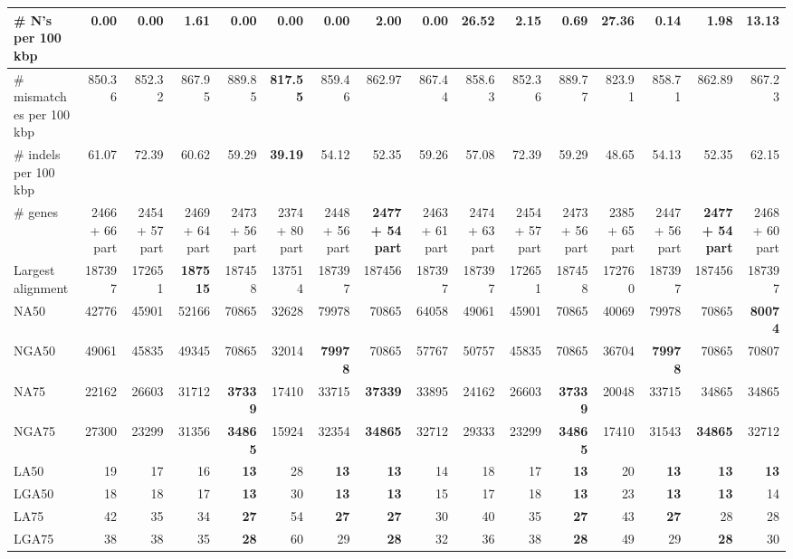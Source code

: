 \documentclass[12pt,a4paper]{article}
\begin{document}
\begin{table}[ht]
\begin{center}
\begin{tabular}{|l*{15}{|r}|}
\# N's per 100 kbp & {\bf 0.00} & {\bf 0.00} & 1.61 & {\bf 0.00} & {\bf 0.00} & {\bf 0.00} & 2.00 & {\bf 0.00} & 26.52 & 2.15 & 0.69 & 27.36 & 0.14 & 1.98 & 13.13 \\ \hline
\# mismatches per 100 kbp & 850.36 & 852.32 & 867.95 & 889.85 & {\bf 817.55} & 859.46 & 862.97 & 867.44 & 858.63 & 852.36 & 889.77 & 823.91 & 858.71 & 862.89 & 867.23 \\ \hline
\# indels per 100 kbp & 61.07 & 72.39 & 60.62 & 59.29 & {\bf 39.19} & 54.12 & 52.35 & 59.26 & 57.08 & 72.39 & 59.29 & 48.65 & 54.13 & 52.35 & 62.15 \\ \hline
\# genes & 2466 + 66 part & 2454 + 57 part & 2469 + 64 part & 2473 + 56 part & 2374 + 80 part & 2448 + 56 part & {\bf 2477 + 54 part} & 2463 + 61 part & 2474 + 63 part & 2454 + 57 part & 2473 + 56 part & 2385 + 65 part & 2447 + 56 part & {\bf 2477 + 54 part} & 2468 + 60 part \\ \hline
Largest alignment & 187397 & 172651 & {\bf 187515} & 187458 & 137514 & 187397 & 187456 & 187397 & 187397 & 172651 & 187458 & 172760 & 187397 & 187456 & 187397 \\ \hline
NA50 & 42776 & 45901 & 52166 & 70865 & 32628 & 79978 & 70865 & 64058 & 49061 & 45901 & 70865 & 40069 & 79978 & 70865 & {\bf 80074} \\ \hline
NGA50 & 49061 & 45835 & 49345 & 70865 & 32014 & {\bf 79978} & 70865 & 57767 & 50757 & 45835 & 70865 & 36704 & {\bf 79978} & 70865 & 70807 \\ \hline
NA75 & 22162 & 26603 & 31712 & {\bf 37339} & 17410 & 33715 & {\bf 37339} & 33895 & 24162 & 26603 & {\bf 37339} & 20048 & 33715 & 34865 & 34865 \\ \hline
NGA75 & 27300 & 23299 & 31356 & {\bf 34865} & 15924 & 32354 & {\bf 34865} & 32712 & 29333 & 23299 & {\bf 34865} & 17410 & 31543 & {\bf 34865} & 32712 \\ \hline
LA50 & 19 & 17 & 16 & {\bf 13} & 28 & {\bf 13} & {\bf 13} & 14 & 18 & 17 & {\bf 13} & 20 & {\bf 13} & {\bf 13} & {\bf 13} \\ \hline
LGA50 & 18 & 18 & 17 & {\bf 13} & 30 & {\bf 13} & {\bf 13} & 15 & 17 & 18 & {\bf 13} & 23 & {\bf 13} & {\bf 13} & 14 \\ \hline
LA75 & 42 & 35 & 34 & {\bf 27} & 54 & {\bf 27} & {\bf 27} & 30 & 40 & 35 & {\bf 27} & 43 & {\bf 27} & 28 & 28 \\ \hline
LGA75 & 38 & 38 & 35 & {\bf 28} & 60 & 29 & {\bf 28} & 32 & 36 & 38 & {\bf 28} & 49 & 29 & {\bf 28} & 30 \\ \hline
\end{tabular}
\end{center}
\end{table}
\end{document}
